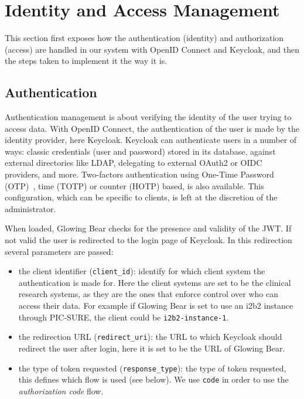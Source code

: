 \section{Identity and Access Management}

This section first exposes how the authentication (identity) and authorization (access) are handled in our system with OpenID Connect and Keycloak, and then the steps taken to implement it the way it is.



\subsection{Authentication}

Authentication management is about verifying the identity of the user trying to access data.
With OpenID Connect, the authentication of the user is made by the identity provider, here Keycloak.
Keycloak can authenticate users in a number of ways: classic credentials (user and password) stored in its database, against external directories like LDAP, delegating to external OAuth2 or OIDC providers, and more.
Two-factors authentication using One-Time Password (OTP)~\cite{todo}, time (TOTP) or counter (HOTP) based, is also available.
This configuration, which can be specific to clients, is left at the discretion of the administrator. 

When loaded, Glowing Bear checks for the presence and validity of the JWT. 
If not valid the user is redirected to the login page of Keycloak. 
In this redirection several parameters are passed:

\begin{itemize}
    \item the client identifier (\verb|client_id|): identify for which client system the authentication is made for.
    Here the client systems are set to be the clinical research systems, as they are the ones that enforce control over who can access their data. For example if Glowing Bear is set to use an i2b2 instance through PIC-SURE, the client could be \verb|i2b2-instance-1|.
    \item the redirection URL (\verb|redirect_uri|): the URL to which Keycloak should redirect the user after login, here it is set to be the URL of Glowing Bear.
    \item the type of token requested (\verb|response_type|): the type of token requested, this defines which flow is used (see below). We use \verb|code| in order to use the \emph{authorization code} flow.
\end{itemize}


